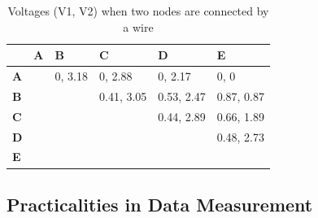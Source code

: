 \begin{table}[H]
\centering
\label{tab:5r_voltages}
\begin{tabular}{|l|l|l|l|l|l|}
\hline
           & \textbf{A}                                      & \textbf{B}                                      & \textbf{C}                                      & \textbf{D}                                      & \textbf{E}                                      \\ \hline
\textbf{A} & \cellcolor[HTML]{C0C0C0}                        & 0, 3.18                                         & 0, 2.88                                         & 0, 2.17                                         & 0, 0                                            \\ \hline
\textbf{B} & \cellcolor[HTML]{C0C0C0}                        & \cellcolor[HTML]{C0C0C0}                        & 0.41, 3.05                                      & 0.53, 2.47                                      & 0.87, 0.87                                      \\ \hline
\textbf{C} & \cellcolor[HTML]{C0C0C0}                        & \cellcolor[HTML]{C0C0C0}                        & \cellcolor[HTML]{C0C0C0}                        & 0.44, 2.89                                      & 0.66, 1.89                                      \\ \hline
\textbf{D} & \cellcolor[HTML]{C0C0C0}                        & \cellcolor[HTML]{C0C0C0}                        & \cellcolor[HTML]{C0C0C0}                        & \cellcolor[HTML]{C0C0C0}                        & 0.48, 2.73                                      \\ \hline
\textbf{E} & \cellcolor[HTML]{C0C0C0}{\color[HTML]{333333} } & \cellcolor[HTML]{C0C0C0}{\color[HTML]{333333} } & \cellcolor[HTML]{C0C0C0}{\color[HTML]{333333} } & \cellcolor[HTML]{C0C0C0}{\color[HTML]{333333} } & \cellcolor[HTML]{C0C0C0}{\color[HTML]{333333} } \\ \hline
\end{tabular}
\caption{Voltages (V1, V2) when two nodes are connected by a wire}
\end{table}



\subsection{Practicalities in Data Measurement}


